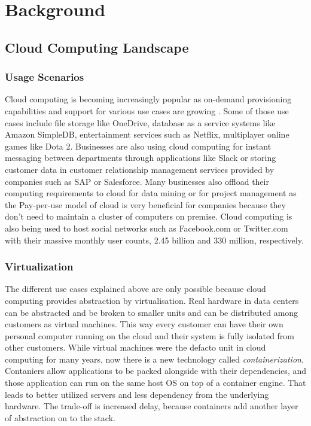
\chapter{Background}\label{chapter:background} %

\section{Cloud Computing Landscape} %
\subsection{Usage Scenarios}
Cloud computing is becoming increasingly popular as on-demand provisioning capabilities and support for various use cases are growing \cite{cloud-use-cases}. Some of those use cases include file storage like OneDrive, database as a service systems like Amazon SimpleDB, entertainment services such as Netflix, multiplayer online games like Dota 2. Businesses are also using cloud computing for instant messaging between departments through applications like Slack or storing customer data in customer relationship management services provided by companies such as SAP or Salesforce. Many businesses also offload their computing requirements to cloud for data mining or for project management as the Pay-per-use model of cloud is very beneficial for companies because they don't need to maintain a cluster of computers on premise. Cloud computing is also being used to host social networks such as Facebook.com or Twitter.com with their massive monthly user counts, 2.45 billion and 330 million, respectively.

\subsection{Virtualization}
The different use cases explained above are only possible because cloud computing provides abstraction by virtualisation. Real hardware in data centers can be abstracted and be broken to smaller units and can be distributed among customers as virtual machines. This way every customer can have their own personal computer running on the cloud and their system is fully isolated from other customers. While virtual machines were the defacto unit in cloud computing for many years, now there is a new technology called \textit{containerization}. Contaniers allow applications to be packed alongside with their dependencies, and those application can run on the same host OS on top of a container engine. That leads to better utilized servers and less dependency from the underlying hardware. The trade-off is increased delay, because containers add another layer of abstraction on to the stack.

